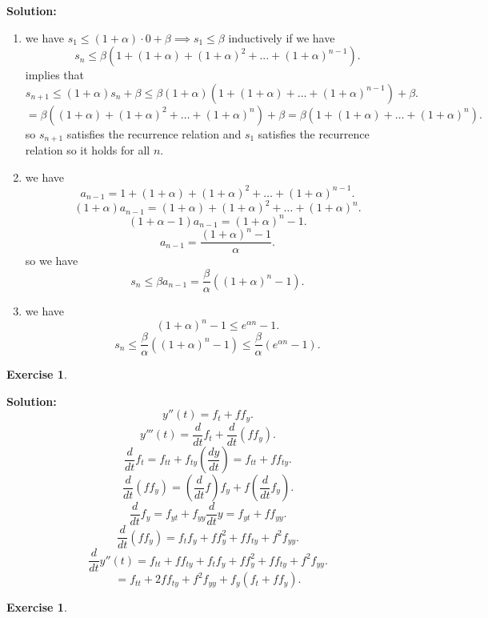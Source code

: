 \documentclass[a4paper,12pt]{scrartcl} %
\newenvironment{solution}
  {\par\color{answercolor}\textbf{Solution:}\ }
  {\par}
\newcounter{customcounter}
\theoremstyle{darktheorem}
\newtheorem{exercise}[customcounter]{Exercise}
\begin{document}
\begin{solution}
    \begin{enumerate}
        \item we have $s_1 \le (1 + \alpha) \cdot 0 + \beta \implies s_1 \le \beta$
            inductively if we have
            \[
            s_n \le \beta(1 + (1+\alpha) + (1 + \alpha)^2 + ... + (1+\alpha)^{n-1})
            .\] 
            implies that
            \[
                s_{n+1} \le (1+\alpha)s_n + \beta \le \beta(1+\alpha)(1 + (1+\alpha) + \dots + (1+\alpha)^{n-1}) + \beta
            .\] 
            \[
            = \beta((1+\alpha) + (1+\alpha)^2 + \dots + (1+\alpha)^{n}) + \beta = \beta(1 + (1+\alpha) + \dots + (1+\alpha)^{n})
            .\] 
            so $s_{n+1}$ satisfies the recurrence relation and $s_1$ satisfies the recurrence relation so it holds for all $n$.
        \item 
            we have
            \[
                a_{n-1} = 1 + (1+\alpha) + (1+\alpha)^2 + \dots + (1+\alpha)^{n-1}
            .\] 
            \[
                (1+\alpha)a_{n-1} = (1+\alpha) + (1+\alpha)^2 +  \dots + (1+\alpha)^{n}
            .\] 
            \[
                (1+\alpha-1)a_{n-1} = (1+\alpha)^{n} - 1
            .\] 
            \[
                a_{n-1} = \frac{(1+\alpha)^{n}-1}{\alpha}
            .\] 
            so we have
            \[
                s_n \le \beta a_{n-1} = \frac{\beta}{\alpha}((1+\alpha)^{n}-1)
            .\] 
        \item 
            we have
            \[
                (1+\alpha)^{n}-1 \le e^{\alpha n} - 1
            .\] 
            \[
            s_n \le \frac{\beta}{\alpha}((1+\alpha)^{n}-1) \le \frac{\beta}{\alpha}(e^{\alpha n} - 1)
            .\] 
    \end{enumerate}
    \begin{exercise}
        
    \end{exercise}
    \begin{solution}
        \[
        y''(t) = f_t + f f_y
        .\] 
        \[
        y'''(t) = \frac{d}{dt}f_t + \frac{d}{dt}(f f_y)
        .\] 
        \[
            \frac{d}{dt} f_t = f_{tt} + f_{ty} (\frac{dy}{dt}) = f_{tt} + f f_{ty}
        .\] 
        \[
        \frac{d}{dt}(f f_y) = (\frac{d}{dt}f) f_y + f (\frac{d}{dt} f_y)
        .\] 
        \[
            \frac{d}{dt}f_y = f_{yt} + f_{yy} \frac{d}{dt}y = f_{yt} + ff_{yy}
        .\] 
        \[
            \frac{d}{dt}(f f_y) = f_tf_y + f f_y^2 + ff_{ty} + f^2f_{yy}
        .\] 
        \[
            \frac{d}{dt}y''(t) = f_{tt} + ff_{ty} + f_tf_y + ff_y^2 + ff_{ty} + f^2f_{yy}
        .\] 
        \[
            = f_{tt} + 2ff_{ty} +  f^2f_{yy} + f_y(f_t + ff_y)
        .\] 
    \end{solution}
    \begin{exercise}
        

\end{exercise}
\end{solution}
\end{document}

